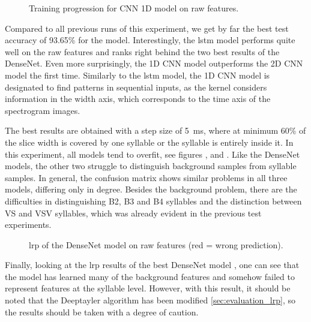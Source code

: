 \begin{figure}[ht!]
\centering
  \hfill
  \caption{Training progression for CNN 1D model \cite{nn_cnn_1d_scs_r3_p30s5l60_raw_100} on raw features.}
  \label{fig:train_val_cnn_1d_scs_r3_p30s5l60_raw_100}
\end{figure}
Compared to all previous runs of this experiment, we get by far the best test accuracy of 93.65\% for the \cite{nn_densNet_scs_r3_p30s5l60_raw_100} model.
Interestingly, the \gls{lstm} model \cite{nn_lstm_scs_r3_p30s5l60_raw_100} performs quite well on the raw features and ranks right behind the two best results of the DenseNet.
Even more surprisingly, the 1D CNN model outperforms the 2D CNN model the first time. Similarly to the \gls{lstm} model, the 1D CNN model is designated to find patterns in sequential inputs, as the kernel considers information in the width axis, which corresponds to the time axis of the spectrogram images.

The best results are obtained with a step size of \SI{5}{\milli\second}, where at minimum 60\% of the slice width is covered by one syllable or the syllable is entirely inside it. In this experiment, all models tend to overfit, see figures ,  and . Like the DenseNet models, the other two struggle to distinguish background samples from syllable samples. In general, the confusion matrix shows similar problems in all three models, differing only in degree. Besides the background problem, there are the difficulties in distinguishing B2, B3 and B4 syllables and the distinction between VS and VSV syllables, which was already evident in the previous test experiments.

\begin{figure}[ht!]
\centering
  \hfill
  \caption{\Gls{lrp} of the DenseNet model \cite{nn_densNet_scs_r3_p30s5l60_raw_100} on raw features (red = wrong prediction).}
  \label{fig:lrp_densNet_scs_r3_p30s5l60_raw_100}
\end{figure}

Finally, looking at the \gls{lrp} results  of the best DenseNet model \cite{nn_densNet_scs_r3_p30s5l60_raw_100}, one can see that the model has learned many of the background features and somehow failed to represent features at the syllable level. However, with this result, it should be noted that the Deeptayler algorithm has been modified \ref{sec:evaluation_lrp}, so the results should be taken with a degree of caution.

